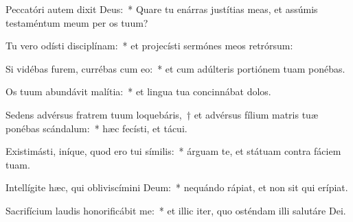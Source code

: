 
\item Peccatóri autem dixit Deus:~* Quare tu enárras justítias meas, et assúmis testaméntum meum per os tuum?

\item Tu vero odísti disciplínam:~* et projecísti sermónes meos retrórsum:

\item Si vidébas furem, currébas cum eo:~* et cum adúlteris portiónem tuam ponébas.

\item Os tuum abundávit malítia:~* et lingua tua concinnábat dolos.

\item Sedens advérsus fratrem tuum loquebáris,~† et advérsus fílium matris tuæ ponébas scándalum:~* hæc fecísti, et tácui.

\item Existimásti, iníque, quod ero tui símilis:~* árguam te, et státuam contra fáciem tuam.

\item Intellígite hæc, qui obliviscímini Deum:~* nequándo rápiat, et non sit qui erípiat.

\item Sacrifícium laudis honorificábit me:~* et illic iter, quo osténdam illi salutáre Dei.